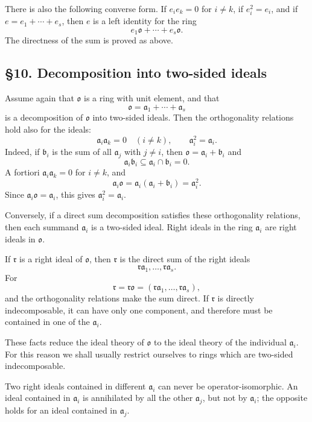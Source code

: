 \documentclass[11pt]{article}
\begin{document}
There is also the following converse form. If \(e_i e_k=0\) for
\(i\ne k\), if \(e_i^2=e_i\), and if \(e=e_1+\cdots+e_s\), then \(e\) is
a left identity for the ring \[
  e_1\mathfrak{o}+\cdots+e_s\mathfrak{o}.
\] The directness of the sum is proved as above.

\subsection{§10. Decomposition into two-sided
ideals}\label{decomposition-into-two-sided-ideals}

Assume again that \(\mathfrak{o}\) is a ring with unit element, and that
\[
  \mathfrak{o}=\mathfrak a_1+\cdots+\mathfrak a_s
\] is a decomposition of \(\mathfrak{o}\) into two-sided ideals. Then
the orthogonality relations hold also for the ideals: \[
  \mathfrak a_i\mathfrak a_k=0\quad(i\ne k),
  \qquad
  \mathfrak a_i^2=\mathfrak a_i.
\] Indeed, if \(\mathfrak b_i\) is the sum of all \(\mathfrak a_j\) with
\(j\ne i\), then \(\mathfrak{o}=\mathfrak a_i+\mathfrak b_i\) and \[
  \mathfrak a_i\mathfrak b_i\subseteq\mathfrak a_i\cap\mathfrak b_i=0.
\] A fortiori \(\mathfrak a_i\mathfrak a_k=0\) for \(i\ne k\), and \[
  \mathfrak a_i\mathfrak{o}=\mathfrak a_i(\mathfrak a_i+\mathfrak b_i)=\mathfrak a_i^2.
\] Since \(\mathfrak a_i\mathfrak{o}=\mathfrak a_i\), this gives
\(\mathfrak a_i^2=\mathfrak a_i\).

Conversely, if a direct sum decomposition satisfies these orthogonality
relations, then each summand \(\mathfrak a_i\) is a two-sided ideal.
Right ideals in the ring \(\mathfrak a_i\) are right ideals in
\(\mathfrak{o}\).

If \(\mathfrak r\) is a right ideal of \(\mathfrak{o}\), then
\(\mathfrak r\) is the direct sum of the right ideals \[
  \mathfrak r\mathfrak a_1,\ldots,\mathfrak r\mathfrak a_s.
\] For \[
  \mathfrak r=\mathfrak r\mathfrak{o}=(\mathfrak r\mathfrak a_1,\ldots,\mathfrak r\mathfrak a_s),
\] and the orthogonality relations make the sum direct. If
\(\mathfrak r\) is directly indecomposable, it can have only one
component, and therefore must be contained in one of the
\(\mathfrak a_i\).

These facts reduce the ideal theory of \(\mathfrak{o}\) to the ideal
theory of the individual \(\mathfrak a_i\). For this reason we shall
usually restrict ourselves to rings which are two-sided indecomposable.

Two right ideals contained in different \(\mathfrak a_i\) can never be
operator-isomorphic. An ideal contained in \(\mathfrak a_i\) is
annihilated by all the other \(\mathfrak a_j\), but not by
\(\mathfrak a_i\); the opposite holds for an ideal contained in
\(\mathfrak a_j\).
\end{document}
